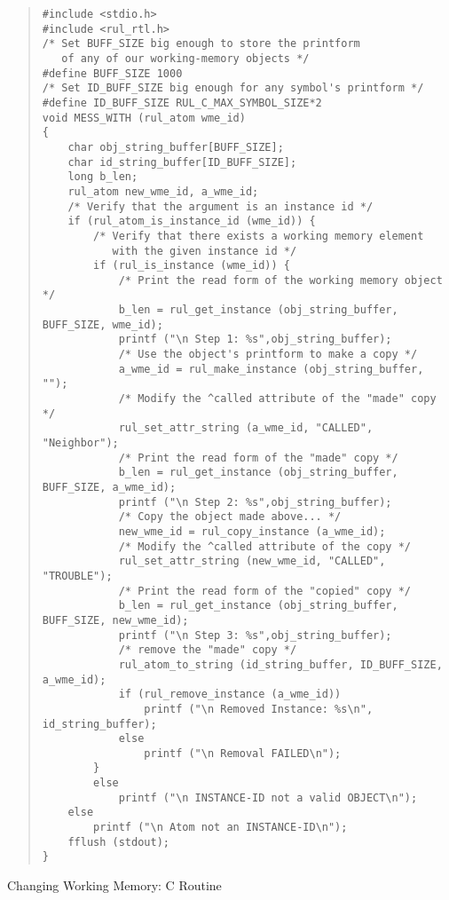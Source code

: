 \begin{example}[h]
\renewcommand{\baselinestretch}{0.9}
\begin{quote}
\begin{verbatim}
#include <stdio.h>
#include <rul_rtl.h>
/* Set BUFF_SIZE big enough to store the printform
   of any of our working-memory objects */
#define BUFF_SIZE 1000
/* Set ID_BUFF_SIZE big enough for any symbol's printform */
#define ID_BUFF_SIZE RUL_C_MAX_SYMBOL_SIZE*2
void MESS_WITH (rul_atom wme_id)
{
    char obj_string_buffer[BUFF_SIZE];
    char id_string_buffer[ID_BUFF_SIZE];
    long b_len;
    rul_atom new_wme_id, a_wme_id;
    /* Verify that the argument is an instance id */
    if (rul_atom_is_instance_id (wme_id)) {
        /* Verify that there exists a working memory element
           with the given instance id */
        if (rul_is_instance (wme_id)) {
            /* Print the read form of the working memory object */
            b_len = rul_get_instance (obj_string_buffer, BUFF_SIZE, wme_id);
            printf ("\n Step 1: %s",obj_string_buffer);
            /* Use the object's printform to make a copy */
            a_wme_id = rul_make_instance (obj_string_buffer, "");
            /* Modify the ^called attribute of the "made" copy */
            rul_set_attr_string (a_wme_id, "CALLED", "Neighbor");
            /* Print the read form of the "made" copy */
            b_len = rul_get_instance (obj_string_buffer, BUFF_SIZE, a_wme_id);
            printf ("\n Step 2: %s",obj_string_buffer);
            /* Copy the object made above... */
            new_wme_id = rul_copy_instance (a_wme_id);
            /* Modify the ^called attribute of the copy */
            rul_set_attr_string (new_wme_id, "CALLED", "TROUBLE");
            /* Print the read form of the "copied" copy */
            b_len = rul_get_instance (obj_string_buffer, BUFF_SIZE, new_wme_id);
            printf ("\n Step 3: %s",obj_string_buffer);
            /* remove the "made" copy */
            rul_atom_to_string (id_string_buffer, ID_BUFF_SIZE, a_wme_id);
            if (rul_remove_instance (a_wme_id))
                printf ("\n Removed Instance: %s\n", id_string_buffer);
            else
                printf ("\n Removal FAILED\n");
        }
        else
            printf ("\n INSTANCE-ID not a valid OBJECT\n");
    else
        printf ("\n Atom not an INSTANCE-ID\n");
    fflush (stdout);
}
\end{verbatim}
\end{quote}
\caption{Changing Working Memory: C Routine}
\label{e:6-9}
\end{example}

